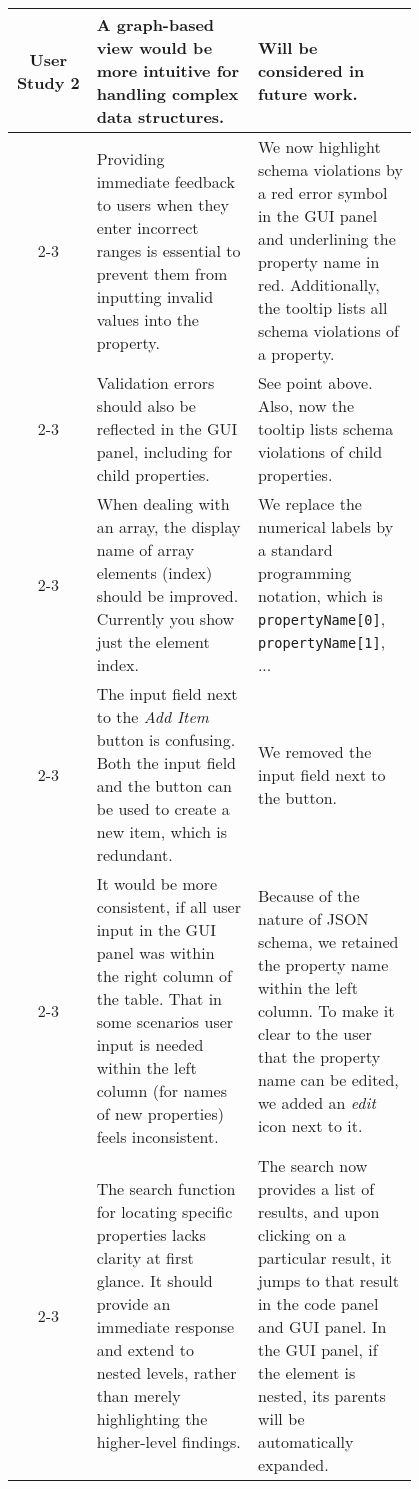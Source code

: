 \begin{table*}

    \centering
    \small %
    \setlength{\extrarowheight}{5pt} %
    \renewcommand{\arraystretch}{1.5} %
    \begin{tabular}{|c|p{0.4\linewidth}|p{0.4\linewidth}|}
        \hline
        User Study 2 & A graph-based view would be more intuitive for handling complex data structures. &
        Will be considered in future work. \\
        \cline{2-3}
        & Providing immediate feedback to users when they enter incorrect ranges is essential to prevent them from inputting invalid values into the property. &
        We now highlight schema violations by a red error symbol in the GUI panel and underlining the property name in red.
        Additionally, the tooltip lists all schema violations of a property. \\
        \cline{2-3}
        & Validation errors should also be reflected in the GUI panel, including for child properties. &
        See point above.
        Also, now the tooltip lists schema violations of child properties. \\
        \cline{2-3}
        & When dealing with an array, the display name of array elements (index) should be improved.
        Currently you show just the element index. &
        We replace the numerical labels by a standard programming notation, which is \texttt{propertyName[0]}, \texttt{propertyName[1]}, ...
        \\
        \cline{2-3}
        & The input field next to the \textit{Add Item} button is confusing. Both the input field and the button can be used to create a new item, which is redundant.
        & We removed the input field next to the button. \\
        \cline{2-3}
        & It would be more consistent, if all user input in the GUI panel was within the right column of the table.
        That in some scenarios user input is needed within the left column (for names of new properties) feels inconsistent.
         & Because of the nature of JSON schema, we retained the property name within the left column.
         To make it clear to the user that the property name can be edited, we added an \textit{edit} icon next to it. \\
        \cline{2-3}
        & The search function for locating specific properties lacks clarity at first glance.
        It should provide an immediate response and extend to nested levels, rather than merely highlighting the higher-level findings. &
        The search now provides a list of results, and upon clicking on a particular result, it jumps to that result in the code panel and GUI panel. In the GUI panel, if the element is nested, its parents will be automatically expanded. \\
        \hline
    \end{tabular}
    \caption*{User Study Feedback and Resolution (Continued)} \label{tab:user_study2}

\end{table*}

